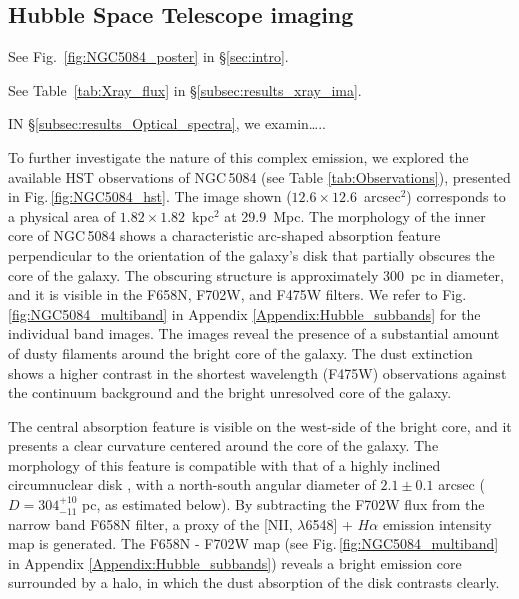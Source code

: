\documentclass[modern]{aastex631}
\begin{document}
\subsection{Hubble Space Telescope imaging} 
\label{subsec:results_hst}

See Fig.~\ref{fig:NGC5084_poster} in \S\ref{sec:intro}.

See Table~\ref{tab:Xray_flux} in \S\ref{subsec:results_xray_ima}.

IN \S\ref{subsec:results_Optical_spectra}, we examin…..

To further investigate the nature of this complex emission, we explored the available HST observations of NGC\,5084 (see Table \ref{tab:Observations}), presented in Fig.\,\ref{fig:NGC5084_hst}. 
The image shown ($12.6\times12.6$~arcsec$^2$) corresponds to a physical area of $1.82\times1.82$~kpc$^2$ at 29.9~Mpc. The morphology of the inner core of NGC\,5084 shows a characteristic arc-shaped absorption feature perpendicular to the orientation of the galaxy's disk that partially obscures the core of the galaxy. The obscuring structure is approximately 300~pc in diameter, and it is visible in the F658N, F702W, and F475W filters. We refer to Fig.\,\ref{fig:NGC5084_multiband} in Appendix \ref{Appendix:Hubble_subbands} for the individual band images. The images reveal the presence of a substantial amount of dusty filaments around the bright core of the galaxy. The dust extinction shows a higher contrast in the shortest wavelength (F475W) observations against the continuum background and the bright unresolved core of the galaxy.

The central absorption feature is visible on the west-side of the bright core, and it presents a clear curvature centered around the core of the galaxy. The morphology of this feature is compatible with that of a highly inclined circumnuclear disk \citep{moellenhoff+1987aap174_63, jaffe+1993nat364_213,  kormendy+1994inproceedings_147, ferrarese+1996apj470_444, vandermarel+1998aj116_2220}, with a north-south angular diameter of $2.1\pm0.1$ arcsec ($D=304^{+10}_{-11}$ pc, as estimated below). By subtracting the F702W flux from the narrow band F658N filter, a proxy of the [NII, $\lambda$6548] + $H\alpha$ emission intensity map is generated. The F658N - F702W map (see Fig.\,\ref{fig:NGC5084_multiband} in Appendix \ref{Appendix:Hubble_subbands}) reveals a bright emission core surrounded by a halo, in which the dust absorption of the disk contrasts clearly. 
\end{document}
